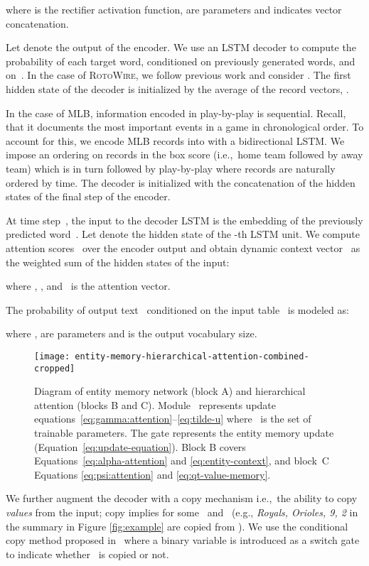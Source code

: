 \documentclass[11pt,a4paper]{article}
\begin{document}
where  is the rectifier activation function,
 are parameters and 
 indicates vector concatenation.

Let  denote the output of the
encoder. We use an LSTM decoder to compute the probability of each
target word, conditioned on previously generated words, and
on~.  In the case of \textsc{RotoWire}, we follow
previous work
\cite{D17-1239,DBLP:journals/corr/abs-1809-00582} and
consider .  The first hidden state of the
decoder is initialized by the average of the record vectors,
.

In the case of MLB, information encoded in play-by-play is
sequential. Recall, that it documents the most important events in a
game in chronological order.  To account for this, we encode MLB
records into  with a bidirectional
LSTM. We impose an ordering on records in the box score (i.e.,~home
team followed by away team) which is in turn followed by play-by-play
where records are naturally ordered by time.  The decoder is
initialized with the concatenation of the hidden states of the final
step of the encoder.

At time step~, the input to the decoder LSTM is the embedding of
the previously predicted word~.  Let  denote
the hidden state of the -th LSTM unit.  We compute attention
scores~ over the encoder output  and
obtain dynamic context vector~ as the weighted sum of
the hidden states of the input:

where , , and~ is the attention vector. 




The probability of output text~ conditioned on the input table~
is modeled as:

where
,
 are parameters and
 is the output vocabulary size.

\begin{figure*}[t]
\centering
\texttt{[image: entity-memory-hierarchical-attention-combined-cropped]}
\caption{Diagram of entity memory network (block A) and hierarchical
  attention (blocks B and C). Module~
represents update
equations~\eqref{eq:gamma:attention}--\eqref{eq:tilde-u}
where~ is the set of trainable parameters. The gate represents 
the entity memory update (Equation~\eqref{eq:update-equation}). 
 Block B covers Equations~\eqref{eq:alpha-attention}
and \eqref{eq:entity-context}, and block~C Equations
\eqref{eq:psi:attention} and \eqref{eq:qt-value-memory}.
\label{fig:entity-memory-updates}}
\end{figure*}

We further augment the decoder with a copy mechanism i.e.,~the ability
to copy \emph{values} from the input; copy implies  for
some~ and~ (e.g., \textsl{Royals, Orioles, 9, 2} in the summary
in Figure \ref{fig:example} are copied from ).  We use the
conditional copy method proposed in~\citet{P16-1014} where a binary
variable is introduced as a switch gate to indicate whether~ is copied
or not.
\end{document}
